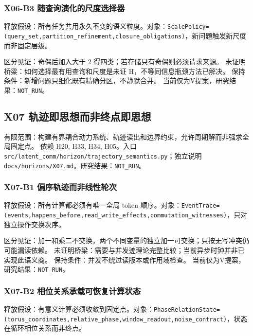 \documentclass[
  10pt,
]{article}
\begin{document}
\subsubsection{X06-B3
随查询演化的尺度选择器}\label{x06-b3-ux968fux67e5ux8be2ux6f14ux5316ux7684ux5c3aux5ea6ux9009ux62e9ux5668}

释放假设：所有任务共用永久不变的语义粒度。对象：\nolinkurl{ScalePolicy=(query_set,partition_refinement,closure_obligations)}，新问题触发新尺度而非固定层级。

区分见证：奇偶后加入大于 2 得四类；若存储只有奇偶则必须请求来源。
未证明桥梁：如何选择最有用查询和尺度是未证 H，不等同信息瓶颈方法已解决。
保持条件：新增问题只细化既有精确分区，不静默合并。
当前仅为V提案，研究结果：\nolinkurl{NOT_RUN}。

\subsection{X07
轨迹即思想而非终点即思想}\label{x07-ux8f68ux8ff9ux5373ux601dux60f3ux800cux975eux7ec8ux70b9ux5373ux601dux60f3}

有限范围：构建有界耦合动力系统、轨迹读出和边界约束，允许周期解而非强求全局固定点。
依赖 H20, H33, H34, H05。入口
{\small\nolinkurl{src/latent_comm/horizon/trajectory_semantics.py}}；独立说明
{\small\nolinkurl{docs/horizons/X07.md}}。研究结果：\nolinkurl{NOT_RUN}。

\subsubsection{X07-B1
偏序轨迹而非线性轮次}\label{x07-b1-ux504fux5e8fux8f68ux8ff9ux800cux975eux7ebfux6027ux8f6eux6b21}

释放假设：所有计算都必须有唯一全局 token
顺序。对象：\nolinkurl{EventTrace=(events,happens_before,read_write_effects,commutation_witnesses)}，只对独立操作交换次序。

区分见证：加一和乘二不交换，两个不同变量的独立加一可交换；只按无写冲突仍可能漏读依赖。
未证明桥梁：需要与并发迹理论完整比较；当前异步时钟并非已实现此语义商。
保持条件：并发不绕过读版本或作用域检查。
当前仅为V提案，研究结果：\nolinkurl{NOT_RUN}。

\subsubsection{X07-B2
相位关系承载可恢复计算状态}\label{x07-b2-ux76f8ux4f4dux5173ux7cfbux627fux8f7dux53efux6062ux590dux8ba1ux7b97ux72b6ux6001}

释放假设：有意义计算必须收敛到固定点。对象：\nolinkurl{PhaseRelationState=(torus_coordinates,relative_phase,window_readout,noise_contract)}，状态在循环相位关系而非终点。
\end{document}
